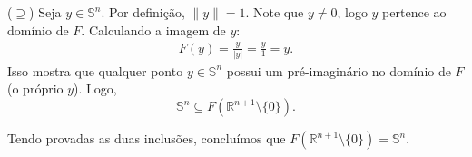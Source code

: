 {	($\supseteq$) Seja $y \in \mathbb{S}^n$. Por definição, $\|y\| = 1$. Note que $y \neq 0$, logo $y$ pertence ao domínio de $F$. Calculando a imagem de $y$:
	\begin{align*}
		F(y) = \frac{y}{|y|} = \frac{y}{1} = y.
	\end{align*}
	Isso mostra que qualquer ponto $y \in \mathbb{S}^n$ possui um pré-imaginário no domínio de $F$ (o próprio $y$). Logo, $$\mathbb{S}^n \subseteq F(\mathbb{R}^{n+1} \setminus \{0\}).$$
	
	Tendo provadas as duas inclusões, concluímos que $F(\mathbb{R}^{n+1} \setminus \{0\}) = \mathbb{S}^n$.
}
